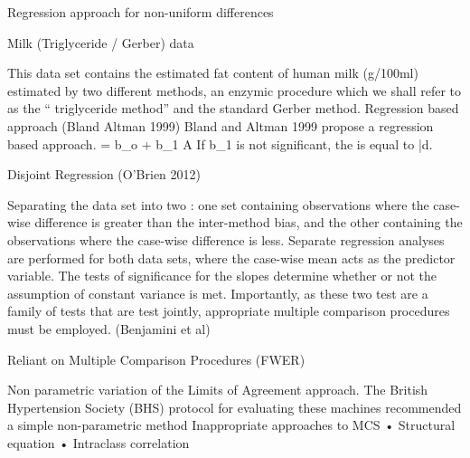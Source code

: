 Regression approach for non-uniform differences

Milk (Triglyceride /  Gerber) data

This data set contains the estimated fat content of human milk (g/100ml) estimated by two different methods, an enzymic procedure which we shall refer to as the “ triglyceride method” and the standard Gerber method.
Regression based approach (Bland Altman 1999)
Bland and Altman 1999 propose a regression based approach.
 = b_o + b_1 A
If b_1 is not significant, the  is equal to \bar{d}.

Disjoint Regression (O’Brien 2012)

Separating the data set into two : one set containing observations where the case-wise difference is greater than the inter-method bias, and the other containing the observations where the case-wise difference is less.
Separate regression analyses are performed for both data sets, where the case-wise mean acts as the predictor variable. The tests of significance for the slopes determine whether or not the assumption of constant variance is met.
Importantly, as these two test are a family of tests that are test jointly, appropriate multiple comparison procedures must be employed.  (Benjamini et al) 

	Reliant on Multiple Comparison Procedures (FWER)


Non parametric variation of the Limits of Agreement  approach.
The British Hypertension Society (BHS) protocol for evaluating these machines recommended a simple non-parametric method
Inappropriate approaches to MCS
•	Structural equation 
•	Intraclass correlation

